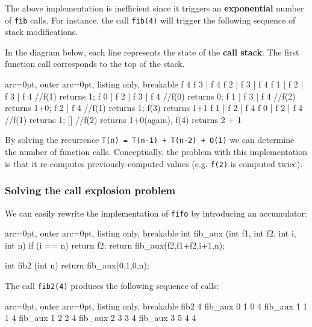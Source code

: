 The above implementation is inefficient since it triggers an \textbf{exponential} number of \texttt{fib} calls. For instance, the call \texttt{fib(4)} will trigger the following sequence of stack modifications.

In the diagram below, each line represents the state of the \textbf{call stack}. The first function call corresponds to the top of the stack. 


\begin{tcblisting}{ arc=0pt, outer arc=0pt, listing only, breakable}
f 4
f 3 | f 4
f 2 | f 3 | f 4
f 1 | f 2 | f 3 | f 4  //f(1) returns 1;
f 0 | f 2 | f 3 | f 4  //f(0) returns 0;
f 1 | f 3 | f 4        //f(2) returns 1+0;
f 2 | f 4              //f(1) returns 1; f(3) returns 1+1
f 1 | f 2 | f 4             
f 0 | f 2 | f 4        //f(1) returns 1;
[]                     //f(2) returns 1+0(again), f(4) returns 2 + 1

\end{tcblisting}


By solving the recurrence \texttt{T(n) = T(n-1) + T(n-2) + O(1)} we can determine the number of function calls. Conceptually, the problem with this implementation is that it re-computes previously-computed values (e.g. \texttt{f(2)} is computed twice).

\subsubsection*{ Solving the call explosion problem }

We can easily rewrite the implementation of \texttt{fifo} by introducing an accumulator:


\begin{tcblisting}{ arc=0pt, outer arc=0pt, listing only, breakable}
int fib_aux (int f1, int f2, int i, int n){
        if (i == n)
                return f2;
        return fib_aux(f2,f1+f2,i+1,n);
}

int fib2 (int n){
        return fib_aux(0,1,0,n);
}

\end{tcblisting}


The call \texttt{fib2(4)} produces the following sequence of calls:

\begin{tcblisting}{ arc=0pt, outer arc=0pt, listing only, breakable}
fib2 4 
fib_aux 0 1 0 4
fib_aux 1 1 1 4
fib_aux 1 2 2 4
fib_aux 2 3 3 4
fib_aux 3 5 4 4 

\end{tcblisting}


